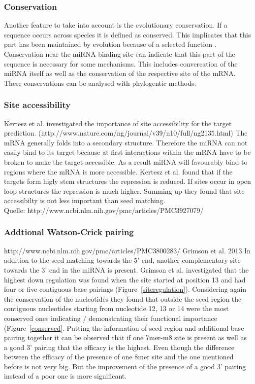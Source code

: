 \documentclass[12pt]{article}
\begin{document}
\subsubsection{Conservation}
Another feature to take into account is the evolutionary conservation. If a sequence occurs across species it is defined as conserved. This implicates that this part has been maintained by evolution because of a selected function \cite{Peterson}. Conservation near the miRNA binding site can indicate that this part of the sequence is necessary for some mechanisms. This includes convercation of the miRNA itself as well as the conservation of the respective site of the mRNA. These conservations can be analysed with phylogentic methods.


\subsubsection{Site accessibility}
Kertesz et al. \cite{Kertesz} investigated the importance of site accessibility for the target prediction. (http://www.nature.com/ng/journal/v39/n10/full/ng2135.html) The mRNA generally folds into a secondary structure. Therefore the miRNA can not easily bind to its target because at first interactions within the mRNA have to be broken to make the target accessible. As a result miRNA will favourably bind to regions where the mRNA is more accessible. Kertesz et al. \cite{Kertesz} found that if the targets form higly stem structures the repression is reduced. If sites occur in open loop structures the repression is much higher. Summing up they found that site accessibilty is not less important than seed matching. \\

Quelle: http://www.ncbi.nlm.nih.gov/pmc/articles/PMC3927079/\\

\subsubsection{Addtional Watson-Crick pairing}
http://www.ncbi.nlm.nih.gov/pmc/articles/PMC3800283/
Grimson et al. 2013
In addition to the seed matching towards the 5' end, another complementary site towards the 3' end in the miRNA is present. Grimson et al. \cite{Grimson} investigated that the highest down regulation was found when the site started at position 13 and had four or five contiguous base pairings (Figure~\ref{siteregulation}). Considering again the conservation of the nucleotides they found that outside the seed region the contiguous nucleotides starting from nucleotide 12, 13 or 14 were the most conserved ones indicating / demonstrating their functional importance (Figure~\ref{conserved}. Putting the information of seed region and additional base pairing together it can be observed that if one 7mer-m8 site is present as well as a good 3' pairing that the efficacy is the highest. Even though the difference between the efficacy of the presence of one 8mer site and the one mentioned before is not very big. But the improvement of the presence of a good 3' pairing instead of a poor one is more significant.  
\end{document}
